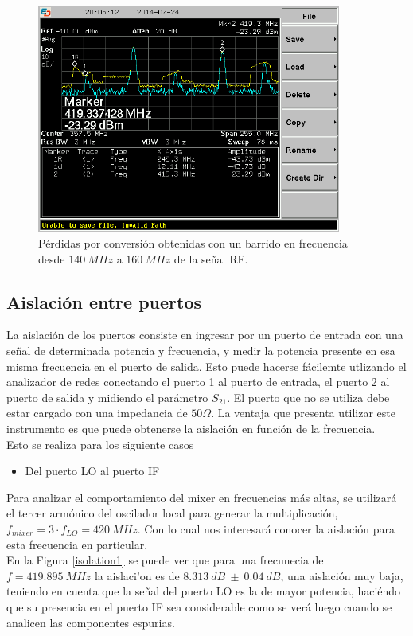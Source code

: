 \documentclass[a4paper,10pt]{article}
\begin{document}
	\begin{figure}[!htb]
		\centering
		\includegraphics[width=10cm]{Images/SCREN538.png}
		\caption{P\'erdidas por conversi\'on obtenidas con un barrido en 
		frecuencia desde $140~MHz$ a $160~MHz$ de la se\~nal RF.}
		\label{perdidas}
	\end{figure}	
	
	\subsection{Aislación entre puertos}
	\indent La aislaci\'on de los puertos consiste en ingresar por un puerto de 
	entrada con una se\~nal de determinada potencia y frecuencia, y medir la 
	potencia presente en esa misma frecuencia en el puerto de salida. Esto puede
	hacerse f\'acilemte utlizando el analizador de redes conectando el puerto 1 
	al puerto de entrada, el puerto 2 al puerto de salida y midiendo el 
	par\'ametro $S_{21}$. El puerto que no se utiliza debe estar cargado con una
	impedancia de $50\Omega$. La ventaja que presenta utilizar este instrumento 
	es que puede obtenerse la aislaci\'on en funci\'on de la frecuencia. \\
	\indent Esto se realiza para los siguiente casos
	
	\begin{itemize}
		\item Del puerto LO al puerto IF
	\end{itemize}
	
	\indent Para analizar el comportamiento del mixer en frecuencias m\'as 
	altas, se utilizar\'a el tercer arm\'onico del oscilador local para generar 
	la multiplicaci\'on, $f_{mixer}=3\cdot f_{LO}=420~MHz$. Con lo cual nos 
	interesar\'a conocer la aislaci\'on para esta frecuencia en particular. \\
	\indent En la Figura \ref{isolation1} se puede ver que para una frecunecia 
	de $f=419.895~MHz$ la aislaci'on es de $8.313~dB~\pm~0.04~dB$, una 
	aislaci\'on muy baja, teniendo en cuenta que la se\~nal del puerto LO es la 
	de mayor potencia, haci\'endo que su presencia en el puerto IF sea 
	considerable como se ver\'a luego cuando se analicen las componentes 
	espurias.
	
\end{document}
